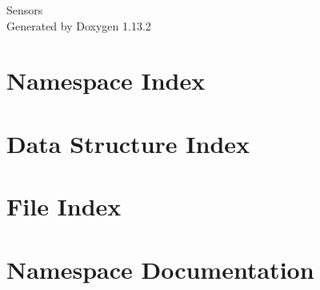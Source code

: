 \documentclass[twoside]{book}
\newcommand{\+}{\discretionary{\mbox{\scriptsize$\hookleftarrow$}}{}{}}
\newcommand{\clearemptydoublepage}{%
    \newpage{\pagestyle{empty}\cleardoublepage}%
  }
\begin{document}
  \raggedbottom
    \hypersetup{pageanchor=false,
                bookmarksnumbered=true,
                pdfencoding=unicode
               }
  \begin{titlepage}
  \vspace*{7cm}
  \begin{center}%
  {\Large Sensors}\\
  \vspace*{1cm}
  {\large Generated by Doxygen 1.13.2}\\
  \end{center}
  \end{titlepage}
  \clearemptydoublepage
  \tableofcontents
  \clearemptydoublepage
  \hypersetup{pageanchor=true}
\chapter{Namespace Index}

\chapter{Data Structure Index}

\chapter{File Index}

\chapter{Namespace Documentation}


\end{document}
